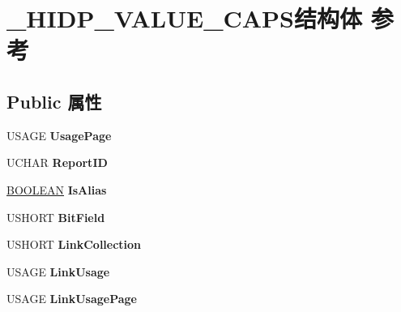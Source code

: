 \hypertarget{struct___h_i_d_p___v_a_l_u_e___c_a_p_s}{}\section{\+\_\+\+H\+I\+D\+P\+\_\+\+V\+A\+L\+U\+E\+\_\+\+C\+A\+P\+S结构体 参考}
\label{struct___h_i_d_p___v_a_l_u_e___c_a_p_s}
\subsection*{Public 属性}
\begin{DoxyCompactItemize}
\item 
\mbox{\label{struct___h_i_d_p___v_a_l_u_e___c_a_p_s_a6b5e496df6676dd52f74e950919aa6a3}} 
U\+S\+A\+GE {\bfseries Usage\+Page}
\item 
\mbox{\label{struct___h_i_d_p___v_a_l_u_e___c_a_p_s_a85dfc65d6c2d567d97689996c35102cd}} 
U\+C\+H\+AR {\bfseries Report\+ID}
\item 
\mbox{\label{struct___h_i_d_p___v_a_l_u_e___c_a_p_s_ae46a3abd5b2a37cae177f53a91f0735c}} 
\hyperlink{_processor_bind_8h_a112e3146cb38b6ee95e64d85842e380a}{B\+O\+O\+L\+E\+AN} {\bfseries Is\+Alias}
\item 
\mbox{\label{struct___h_i_d_p___v_a_l_u_e___c_a_p_s_a2b617bc2580c0a69794773c48ec7fda7}} 
U\+S\+H\+O\+RT {\bfseries Bit\+Field}
\item 
\mbox{\label{struct___h_i_d_p___v_a_l_u_e___c_a_p_s_aff0a0430994f8ceb990b64b3051983c8}} 
U\+S\+H\+O\+RT {\bfseries Link\+Collection}
\item 
\mbox{\label{struct___h_i_d_p___v_a_l_u_e___c_a_p_s_af9e03b38a183352d9744da4ffbfb980a}} 
U\+S\+A\+GE {\bfseries Link\+Usage}
\item 
\mbox{\label{struct___h_i_d_p___v_a_l_u_e___c_a_p_s_a0a163f422318c353dcb4c58888c3b405}} 
U\+S\+A\+GE {\bfseries Link\+Usage\+Page}

\end{DoxyCompactItemize}
